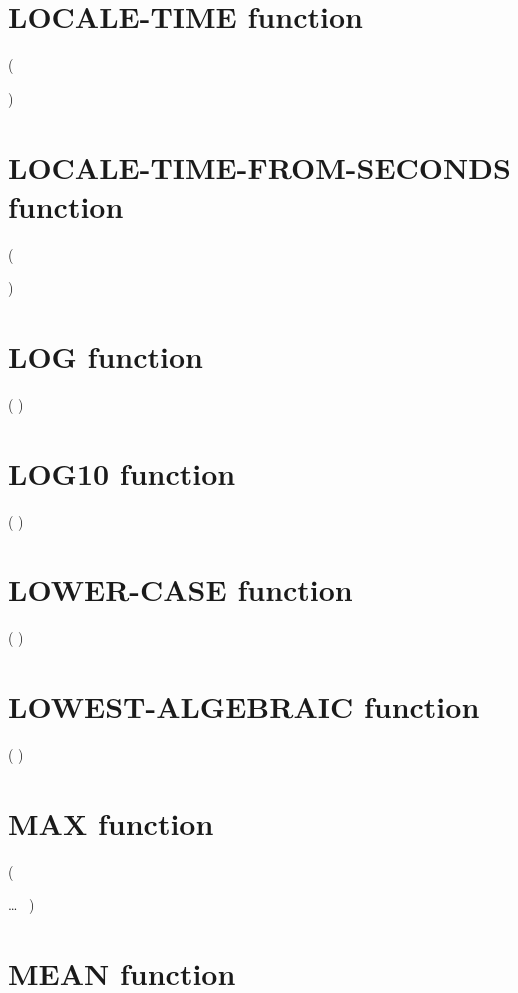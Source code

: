 \section{LOCALE-TIME function}

  ( \argument
\begin{0-1}
  \argument
\end{0-1}
)

\section{LOCALE-TIME-FROM-SECONDS function}

  ( \argument
\begin{0-1}
  \argument
\end{0-1}
)

\section{LOG function}

  ( \argument )

\section{LOG10 function}

  ( \argument )

\section{LOWER-CASE function}

  ( \argument )

\section{LOWEST-ALGEBRAIC function}

  ( \argument )

\section{MAX function}

  (
\begin{1=}
  \argument
\end{1=}\ldots
\ {})

\section{MEAN function}

